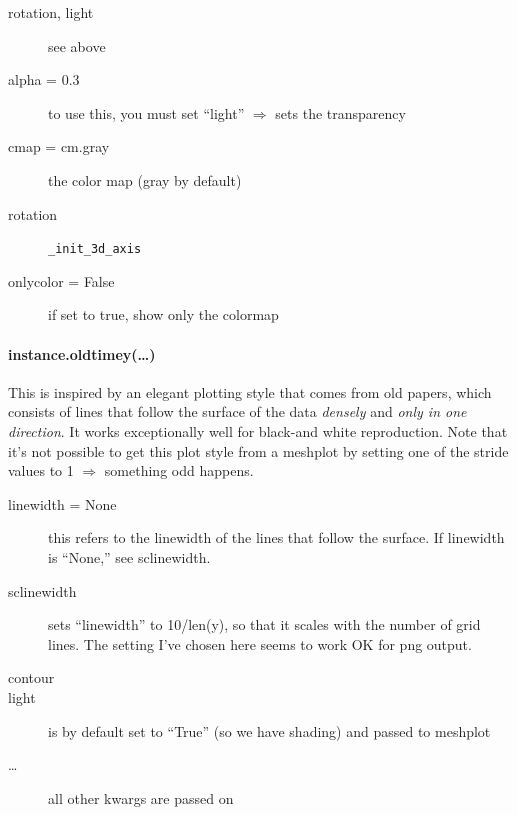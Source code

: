     \begin{mykwargs}
        \begin{description}
            \item[rotation, light] see above
            \item[alpha = 0.3] to use this, you must set
                ``light'' $\Rightarrow$ sets the transparency
            \item[cmap = cm.gray] the color map (gray by default)
            \item[rotation] 
                \texttt{\_init\_3d\_axis}
            \item[onlycolor = False] if set to true, show only
                the colormap
        \end{description}
    \end{mykwargs}


\paragraph{instance.oldtimey(\ldots)}
This is inspired by an elegant plotting style that comes from old papers,
    which consists of lines that follow the surface of the data
    \textit{densely} and \textit{only in one direction}.
It works exceptionally well for black-and white reproduction.
Note that it's not possible to get this plot style from a
    meshplot by setting one of the stride values to 1
    $\Rightarrow$ something odd happens.
    \begin{description}
        \item[linewidth = None] this refers to the linewidth of the lines that follow the surface.  If linewidth is ``None,'' see sclinewidth.
        \item[sclinewidth] sets ``linewidth'' to 10/len(y), so that it scales with the number of grid lines.  The setting I've chosen here seems to work OK for png output.
        \item[contour] 
        \item[light] is by default set to ``True'' (so we have shading) and passed to meshplot
        \item[\ldots] all other kwargs are passed on 
    \end{description}

